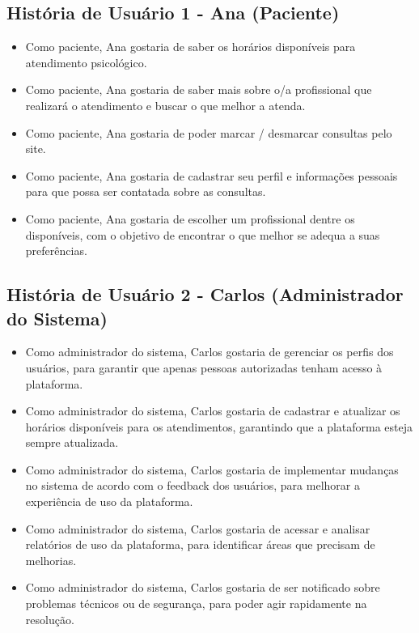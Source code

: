 \documentclass[a4paper,12pt]{report}
\begin{document}
\subsection{História de Usuário 1 - Ana (Paciente)}
\begin{itemize}
    \item Como paciente, Ana gostaria de saber os horários disponíveis para atendimento psicológico.
    \item Como paciente, Ana gostaria de saber mais sobre o/a profissional que realizará o atendimento e buscar o que melhor a atenda.
    \item Como paciente, Ana gostaria de poder marcar / desmarcar consultas pelo site.
    \item Como paciente, Ana gostaria de cadastrar seu perfil e informações pessoais para que possa ser contatada sobre as consultas.
    \item Como paciente, Ana gostaria de escolher um profissional dentre os disponíveis, com o objetivo de encontrar o que melhor se adequa a suas preferências.
\end{itemize}

\subsection{História de Usuário 2 - Carlos (Administrador do Sistema)}
\begin{itemize}
    \item Como administrador do sistema, Carlos gostaria de gerenciar os perfis dos usuários, para garantir que apenas pessoas autorizadas tenham acesso à plataforma.
    \item Como administrador do sistema, Carlos gostaria de cadastrar e atualizar os horários disponíveis para os atendimentos, garantindo que a plataforma esteja sempre atualizada.
    \item Como administrador do sistema, Carlos gostaria de implementar mudanças no sistema de acordo com o feedback dos usuários, para melhorar a experiência de uso da plataforma.
    \item Como administrador do sistema, Carlos gostaria de acessar e analisar relatórios de uso da plataforma, para identificar áreas que precisam de melhorias.
    \item Como administrador do sistema, Carlos gostaria de ser notificado sobre problemas técnicos ou de segurança, para poder agir rapidamente na resolução.
\end{itemize}
\end{document}
